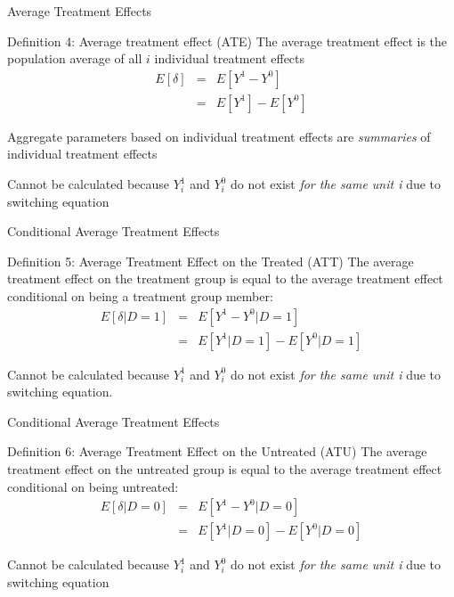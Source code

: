 \documentclass{beamer}
\begin{document}
\begin{frame}{Average Treatment Effects}

  \begin{block}{Definition 4: Average treatment effect (ATE)}
    The average treatment effect is the population average of all $i$ individual treatment effects
    \begin{eqnarray*}
      E[\delta]&=&E[Y^1-Y^0]\\
      &=&E[Y^1] - E[Y^0]
    \end{eqnarray*}
  \end{block}

  \bigskip

Aggregate parameters based on individual treatment effects are \emph{summaries} of individual treatment effects

\bigskip

  Cannot be calculated because $Y^1_i$ and $Y^0_i$ do not exist \emph{for the same unit i} due to switching equation

\end{frame}



\begin{frame}{Conditional Average Treatment Effects}


  \begin{block}{Definition 5: Average Treatment Effect on the Treated (ATT)}
    The average treatment effect on the treatment group is equal to the average treatment effect conditional on being a treatment group member:
    \begin{eqnarray*}
      E[\delta|D=1]&=&E[Y^1-Y^0|D=1] \nonumber \\
      &=&E[Y^1|D=1]-E[Y^0|D=1]
    \end{eqnarray*}
  \end{block}
  Cannot be calculated because $Y^1_i$ and $Y^0_i$ do not exist \emph{for the same unit i} due to switching equation. 


\end{frame}



\begin{frame}{Conditional Average Treatment Effects}

  \begin{block}{Definition 6: Average Treatment Effect on the Untreated (ATU)}
    The average treatment effect on the untreated group is equal to the average treatment effect conditional on being untreated:
    \begin{eqnarray*}
      E[\delta|D=0]&=&E[Y^1-Y^0|D=0] \nonumber \\
      &=&E[Y^1|D=0]-E[Y^0|D=0]
    \end{eqnarray*}
  \end{block}
  Cannot be calculated because $Y^1_i$ and $Y^0_i$ do not exist \emph{for the same unit i} due to switching equation

\end{frame}
\end{document}
